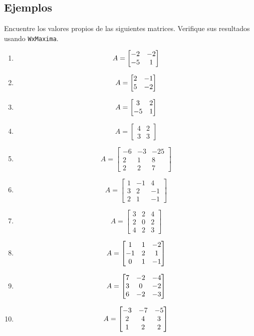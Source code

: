 \subsection*{Ejemplos}


\begin{problema}
\label{exe:diagonal}
 Encuentre los valores propios de las siguientes matrices. Verifique sus resultados usando \texttt{WxMaxima}.
 \begin{enumerate}

 \item $$
A=\begin{bmatrix}-2&-2\\-5&1\end{bmatrix}
 $$

 \item$$A=\begin{bmatrix}2&-1\\5&-2\end{bmatrix}$$

 \item$$A=\begin{bmatrix}3&2\\-5&1\end{bmatrix}$$
 
 \item $$A=\begin{bmatrix}
            4 & 2 \\
            3 & 3
           \end{bmatrix}
$$

\item$$
A=\begin{bmatrix}
   -6 & -3 & -25 \\
   2 & 1 & 8 \\
   2 & 2 & 7
  \end{bmatrix}
$$

\item $$
A=\begin{bmatrix}
   1 & -1 & 4 \\
   3 & 2 & -1 \\
   2 & 1 & -1
  \end{bmatrix}
$$
\item $$
A=\begin{bmatrix}
   3 & 2 & 4 \\
   2 & 0 & 2 \\
   4 & 2 & 3
  \end{bmatrix}
$$

\item$$A=\begin{bmatrix}1&1&-2\\-1&2&1\\0&1&-1\end{bmatrix}$$

\item$$A=\begin{bmatrix}7&-2&-4\\3&0&-2\\6&-2&-3\end{bmatrix}$$

\item$$A=\begin{bmatrix}-3&-7&-5\\2&4&3\\1&2&2\end{bmatrix}$$
\end{enumerate}
\end{problema}



